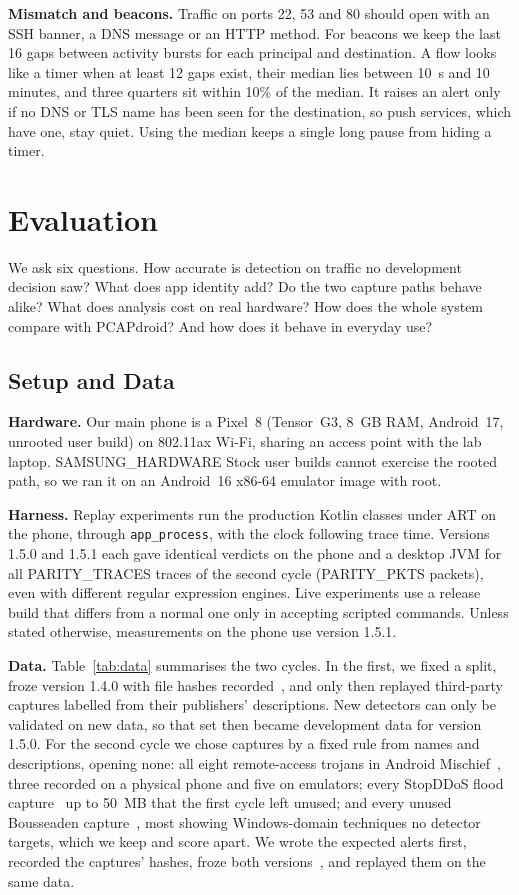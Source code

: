 \documentclass[runningheads]{llncs}
\begin{document}
\textbf{Mismatch and beacons.} Traffic on ports 22, 53 and 80 should open with an SSH banner, a DNS message or an HTTP method. For beacons we keep the last 16 gaps between activity bursts for each principal and destination. A flow looks like a timer when at least 12 gaps exist, their median lies between 10~s and 10 minutes, and three quarters sit within 10\% of the median. It raises an alert only if no DNS or TLS name has been seen for the destination, so push services, which have one, stay quiet. Using the median keeps a single long pause from hiding a timer.

\section{Evaluation}\label{sec:evaluation}

We ask six questions. How accurate is detection on traffic no development decision saw? What does app identity add? Do the two capture paths behave alike? What does analysis cost on real hardware? How does the whole system compare with PCAPdroid? And how does it behave in everyday use?

\subsection{Setup and Data}\label{sec:setup}

\textbf{Hardware.} Our main phone is a Pixel~8 (Tensor~G3, 8~GB RAM, Android~17, unrooted user build) on 802.11ax Wi-Fi, sharing an access point with the lab laptop. {{SAMSUNG_HARDWARE}} Stock user builds cannot exercise the rooted path, so we ran it on an Android~16 x86-64 emulator image with root.

\textbf{Harness.} Replay experiments run the production Kotlin classes under ART on the phone, through \texttt{app\_process}, with the clock following trace time. Versions 1.5.0 and 1.5.1 each gave identical verdicts on the phone and a desktop JVM for all {{PARITY_TRACES}} traces of the second cycle ({{PARITY_PKTS}} packets), even with different regular expression engines. Live experiments use a release build that differs from a normal one only in accepting scripted commands. Unless stated otherwise, measurements on the phone use version 1.5.1.

\textbf{Data.} Table~\ref{tab:data} summarises the two cycles. In the first, we fixed a split, froze version 1.4.0 with file hashes recorded~\cite{repo}, and only then replayed third-party captures labelled from their publishers' descriptions. New detectors can only be validated on new data, so that set then became development data for version 1.5.0. For the second cycle we chose captures by a fixed rule from names and descriptions, opening none: all eight remote-access trojans in Android Mischief~\cite{mischief}, three recorded on a physical phone and five on emulators; every StopDDoS flood capture~\cite{stopddos} up to 50~MB that the first cycle left unused; and every unused Bousseaden capture~\cite{bousseaden}, most showing Windows-domain techniques no detector targets, which we keep and score apart. We wrote the expected alerts first, recorded the captures' hashes, froze both versions~\cite{repo}, and replayed them on the same data.
\end{document}
